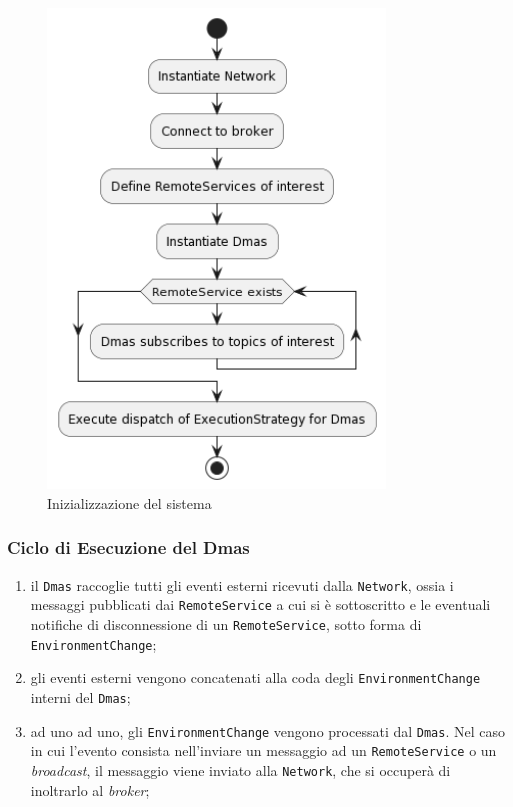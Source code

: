 \begin{figure}
    \centering
    \includegraphics[width=0.8\textwidth]{figures/activity-dmas.png}
    \caption{Inizializzazione del sistema}
    \label{fig:initialization}
\end{figure}

\subsubsection{Ciclo di Esecuzione del Dmas}

\begin{enumerate}
    \item il \texttt{Dmas} raccoglie tutti gli eventi esterni ricevuti dalla \texttt{Network}, ossia i messaggi pubblicati dai \texttt{RemoteService} a cui si è sottoscritto e le eventuali notifiche di disconnessione di un \texttt{RemoteService}, sotto forma di \texttt{EnvironmentChange};
    \item gli eventi esterni vengono concatenati alla coda degli \texttt{EnvironmentChange} interni del \texttt{Dmas};
    \item ad uno ad uno, gli \texttt{EnvironmentChange} vengono processati dal \texttt{Dmas}. Nel caso in cui l'evento consista nell'inviare un messaggio ad un \texttt{RemoteService} o un \textit{broadcast}, il messaggio viene inviato alla \texttt{Network}, che si occuperà di inoltrarlo al \textit{broker};
\end{enumerate}


